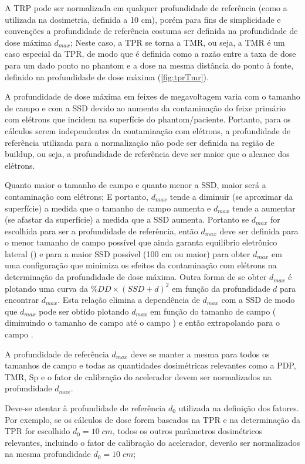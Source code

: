 \documentclass[11pt,a4paper]{article}
\newcounter{exemplo}
\begin{document}
    A TRP pode ser normalizada em qualquer profundidade de referência (como a utilizada na dosimetria, definida a 10 cm), porém para fins de simplicidade e convenções a profundidade de referência costuma ser definida na profundidade de dose máxima $d_{max}$; Neste caso, a TPR se torna a TMR, ou seja, a TMR é um caso especial da TPR, de modo que é definida como a razão entre a taxa de dose para um dado ponto no phantom e a dose na mesma distância do ponto à fonte, definido na profundidade de dose máxima (\ref{fig:tprTmr}). 
    
    A profundidade de dose máxima em feixes de megavoltagem varia com o tamanho de campo e com a SSD devido ao aumento da contaminação do feixe primário com elétrons que incidem na superfície do phantom/paciente. Portanto, para os cálculos serem independentes da contaminação com elétrons, a profundidade de referência utilizada para a normalização não pode ser definida na região de buildup, ou seja, a profundidade de referência deve ser maior que o alcance dos elétrons. 

    Quanto maior o tamanho de campo e quanto menor a SSD, maior será a contaminação com elétrons; E portanto, $d_{max}$ tende a diminuir (se aproximar da superfície) a medida que o tamanho de campo aumenta e $d_{max}$ tende a aumentar (se afastar da superfície) a medida que a SSD aumenta. Portanto se $d_{max}$ for escolhida para ser a profundidade de referência, então $d_{max}$ deve ser definida para o menor tamanho de campo possível que ainda garanta equilíbrio eletrônico lateral () e para a maior SSD possível (100 cm ou maior) para obter $d_{max}$ em uma configuração que minimiza os efeitos da contaminação com elétrons na determinação da profundidade de dose máxima. Outra forma de se obter $d_{max}$ é plotando uma curva da $\%DD \times (SSD + d)^2$ em função da profundidade $d$ para encontrar $d_{max}$. Esta relação elimina a dependência de $d_{max}$ com a SSD de modo que $d_{max}$ pode ser obtido plotando $d_{max}$ em função do tamanho de campo ( diminuindo o tamanho de campo até o campo  ) e então extrapolando para o campo .

    A profundidade de referência $d_{max}$ deve se manter a mesma para todos os tamanhos de campo e todas as quantidades dosimétricas relevantes como a PDP, TMR, Sp e o fator de calibração do acelerador devem ser normalizados na profundidade $d_{max}$. 


    \begin{tcolorbox}[width=\textwidth, colback={white}, colbacktitle={DarkTurquoise!50!white}, title={$\bigstar$ \LobsterTwo{Observação} $\bigstar $}, coltitle={CarnationPink}, colframe={DarkTurquoise}, fonttitle=\rmfamily\bfseries\Large]
        Deve-se atentar à profundidade de referência $d_0$ utilizada na definição dos fatores. Por exemplo, se os cálculos de dose forem baseados na TPR e na determinação da TPR for escolhido $d_0 = 10 \; cm$, todos os outros parâmetros dosimétricos relevantes, incluindo o fator de calibração do acelerador, deverão ser normalizados na mesma profundidade $d_0 = 10\; cm$;
    \end{tcolorbox}
\end{document}
